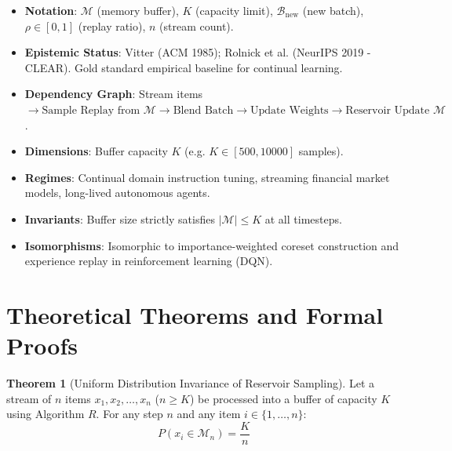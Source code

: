 \documentclass[11pt,a4paper]{article}
\theoremstyle{definition}
\newtheorem{theorem}{\textbf{Theorem}}[section]
\begin{document}
\begin{itemize}
    \item \textbf{Notation}: $\mathcal{M}$ (memory buffer), $K$ (capacity limit), $\mathcal{B}_{\text{new}}$ (new batch), $\rho \in [0, 1]$ (replay ratio), $n$ (stream count).
    \item \textbf{Epistemic Status}: Vitter (ACM 1985); Rolnick et al. (NeurIPS 2019 - CLEAR). Gold standard empirical baseline for continual learning.
    \item \textbf{Dependency Graph}: Stream items $\to \text{Sample Replay from } \mathcal{M} \to \text{Blend Batch} \to \text{Update Weights} \to \text{Reservoir Update } \mathcal{M}$.
    \item \textbf{Dimensions}: Buffer capacity $K$ (e.g. $K \in [500, 10000]$ samples).
    \item \textbf{Regimes}: Continual domain instruction tuning, streaming financial market models, long-lived autonomous agents.
    \item \textbf{Invariants}: Buffer size strictly satisfies $|\mathcal{M}| \le K$ at all timesteps.
    \item \textbf{Isomorphisms}: Isomorphic to importance-weighted coreset construction and experience replay in reinforcement learning (DQN).
\end{itemize}

\section{Theoretical Theorems and Formal Proofs}

\begin{theorem}[Uniform Distribution Invariance of Reservoir Sampling]
Let a stream of $n$ items $x_1, x_2, \dots, x_n$ ($n \ge K$) be processed into a buffer of capacity $K$ using Algorithm $R$. For any step $n$ and any item $i \in \{1, \dots, n\}$:
{\boldmath
\begin{equation}
P(x_i \in \mathcal{M}_n) = \frac{K}{n}
\end{equation}
}
\end{theorem}
\end{document}
